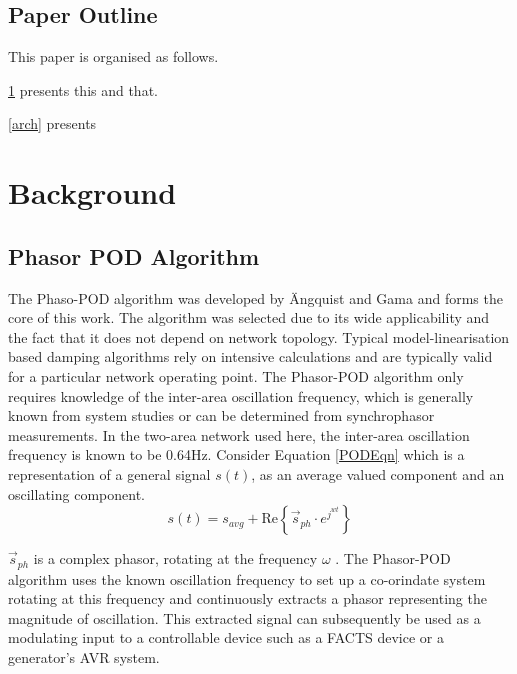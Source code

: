 \documentclass[conference]{IEEEtran}
\begin{document}
\subsection{Paper Outline}
This paper is organised as follows.

\ref{background} presents this and that.

\ref{arch} presents 

\section{Background}\label{background}

\subsection{Phasor POD Algorithm}
The Phaso-POD algorithm was developed by \"{A}ngquist and Gama\cite{PhasorPOD} and forms the core of this work. The algorithm was selected due to its wide applicability and the fact that it does not depend on network topology. Typical model-linearisation based damping algorithms rely on intensive calculations and are typically valid for a particular network operating point. The Phasor-POD algorithm only requires knowledge of the inter-area oscillation frequency, which is generally known from system studies or can be determined from synchrophasor measurements. In the two-area network used here, the inter-area oscillation frequency is known to be 0.64Hz. Consider Equation \ref{PODEqn} which is a representation of a general signal $s(t)$, as an average valued component and an oscillating component.\\

\begin{equation}
s(t)={s}_{avg}+\mathrm{Re}\left\{{\stackrel{\to }{s}}_{ph}\cdot {e}^{{j}^{wt}}\right\}
\label{PODEqn}
\end{equation}

$\stackrel{\to }{s}_{ph}$ is a complex phasor, rotating at the frequency $\omega$ \cite{PhasorPOD}. The Phasor-POD algorithm uses the known oscillation frequency to set up a co-orindate system rotating at this frequency and continuously extracts a phasor representing the magnitude of oscillation\cite{PhasorPOD}. This extracted signal can subsequently be used as a modulating input to a controllable device such as a FACTS device or a generator's AVR system.\\
\end{document}
